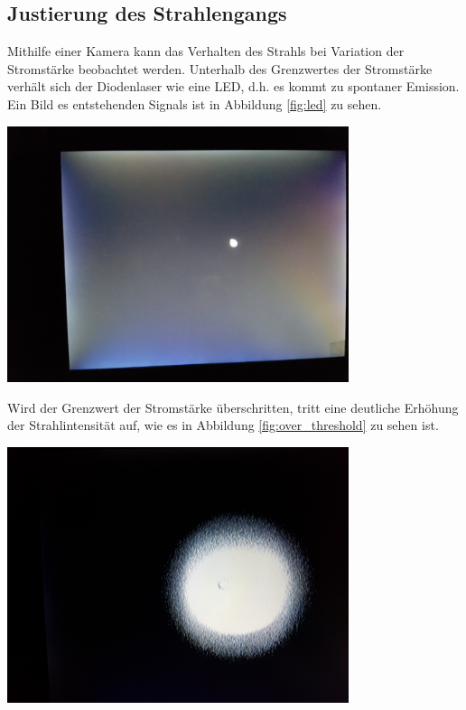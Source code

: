 \documentclass[captions=tableheading]{scrartcl}
\begin{document}
\subsection{Justierung des Strahlengangs}
Mithilfe einer Kamera kann das Verhalten des Strahls bei Variation der Stromstärke beobachtet werden. Unterhalb des Grenzwertes der Stromstärke verhält sich der Diodenlaser wie eine LED, d.h. es kommt zu spontaner Emission. Ein Bild es entstehenden Signals ist in Abbildung \ref{fig:led} zu sehen.
\begin{center}
	\includegraphics[width=10cm]{images/led_spot.jpg}
	\label{fig:led}
\end{center}
Wird der Grenzwert der Stromstärke überschritten, tritt eine deutliche Erhöhung der Strahlintensität auf, wie es in Abbildung \ref{fig:over_threshold} zu sehen ist. 
\newpage
\begin{center}
	\includegraphics[width=10cm]{images/over_threshold.jpg}
	\label{fig:over_threshold}
\end{center}
\end{document}
